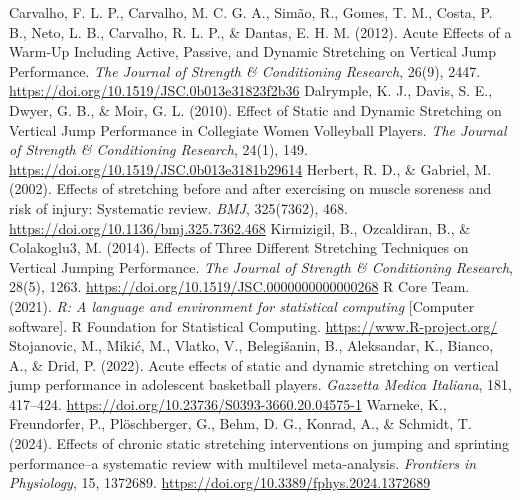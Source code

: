 \documentclass[stu, floatsintext, a4paper]{apa7}
\begin{document}
Carvalho, F. L. P., Carvalho, M. C. G. A., Simão, R., Gomes, T. M., Costa, P. B., Neto, L. B., Carvalho, R. L. P., \& Dantas, E. H. M. (2012). Acute Effects of a Warm-Up Including Active, Passive, and Dynamic Stretching on Vertical Jump Performance. \emph{The Journal of Strength \& Conditioning Research}, 26(9), 2447. \url{https://doi.org/10.1519/JSC.0b013e31823f2b36}
Dalrymple, K. J., Davis, S. E., Dwyer, G. B., \& Moir, G. L. (2010). Effect of Static and Dynamic Stretching on Vertical Jump Performance in Collegiate Women Volleyball Players. \emph{The Journal of Strength \& Conditioning Research}, 24(1), 149. \url{https://doi.org/10.1519/JSC.0b013e3181b29614}
Herbert, R. D., \& Gabriel, M. (2002). Effects of stretching before and after exercising on muscle soreness and risk of injury: Systematic review. \emph{BMJ}, 325(7362), 468. \url{https://doi.org/10.1136/bmj.325.7362.468}
Kirmizigil, B., Ozcaldiran, B., \& Colakoglu3, M. (2014). Effects of Three Different Stretching Techniques on Vertical Jumping Performance. \emph{The Journal of Strength \& Conditioning Research}, 28(5), 1263. \url{https://doi.org/10.1519/JSC.0000000000000268}
R Core Team. (2021). \emph{R: A language and environment for statistical computing} [Computer software]. R Foundation for Statistical Computing. \url{https://www.R-project.org/}
Stojanovic, M., Mikić, M., Vlatko, V., Belegišanin, B., Aleksandar, K., Bianco, A., \& Drid, P. (2022). Acute effects of static and dynamic stretching on vertical jump performance in adolescent basketball players. \emph{Gazzetta Medica Italiana}, 181, 417–424. \url{https://doi.org/10.23736/S0393-3660.20.04575-1}
Warneke, K., Freundorfer, P., Plöschberger, G., Behm, D. G., Konrad, A., \& Schmidt, T. (2024). Effects of chronic static stretching interventions on jumping and sprinting performance–a systematic review with multilevel meta-analysis. \emph{Frontiers in Physiology}, 15, 1372689. \url{https://doi.org/10.3389/fphys.2024.1372689}
\end{document}
